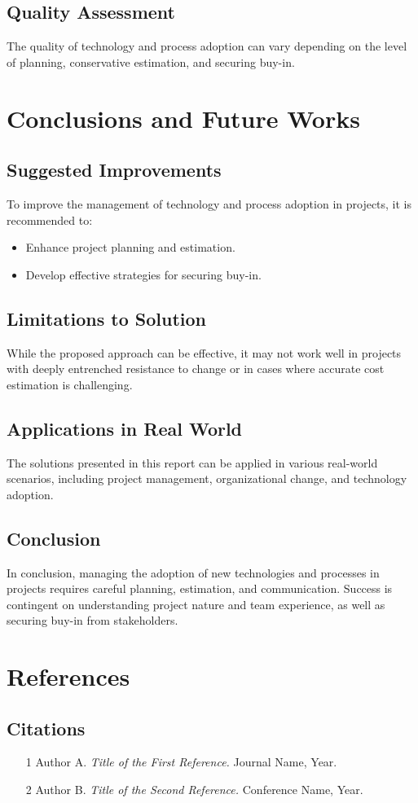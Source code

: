 \documentclass{article}
\begin{document}
\subsection{Quality Assessment}
The quality of technology and process adoption can vary depending on the level of planning, conservative estimation, and securing buy-in.

\section{Conclusions and Future Works}
\subsection{Suggested Improvements}
To improve the management of technology and process adoption in projects, it is recommended to:
\begin{itemize}
  \item Enhance project planning and estimation.
  \item Develop effective strategies for securing buy-in.
\end{itemize}
\subsection{Limitations to Solution}
While the proposed approach can be effective, it may not work well in projects with deeply entrenched resistance to change or in cases where accurate cost estimation is challenging.
\subsection{Applications in Real World}
The solutions presented in this report can be applied in various real-world scenarios, including project management, organizational change, and technology adoption.
\subsection{Conclusion}
In conclusion, managing the adoption of new technologies and processes in projects requires careful planning, estimation, and communication. Success is contingent on understanding project nature and team experience, as well as securing buy-in from stakeholders.

\section{References}
\subsection{Citations}
\begin{itemize}
  \item [1] Author A. \textit{Title of the First Reference.} Journal Name, Year.
  \item [2] Author B. \textit{Title of the Second Reference.} Conference Name, Year.
\end{itemize}
\end{document}
